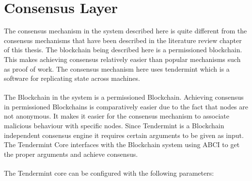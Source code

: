 \documentclass[a4paper,twoside,phd]{BYUPhys}
\begin{document}
\section{Consensus Layer}
The consensus mechanism in the system described here is quite different from the consensus mechanisms that have been described in the literature review chapter of this thesis. The blockchain being described here is a permissioned blockchain. This makes achieving consensus relatively easier than popular mechanisms such as proof of work. The consensus mechanism here uses tendermint which is a software for replicating state across machines.
\\
\\
The Blockchain in the system is a permissioned Blockchain. Achieving consensus in permissioned Blockchains is comparatively easier due to the fact that nodes are not anonymous. It makes it easier for the consensus mechanism to associate malicious behaviour with specific nodes. Since Tendermint is a Blockchain independent consensus engine it requires certain arguments to be given as input. The Tendermint Core interfaces with the Blockchain system using ABCI to get the proper arguments and achieve consensus.
\\
\\
The Tendermint core can be configured with the following parameters:
\end{document}
